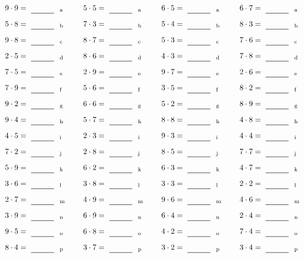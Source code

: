 \documentclass
[
  draft    = true,
  fontsize = 11pt,
  parskip  = half-
]
{scrartcl}
\begin{document}
\par\vfill\par
\begin{align*}
    \pline{9\cdot9}&=\rline{a}
  & \pline{5\cdot5}&=\rline{a}
  & \pline{6\cdot5}&=\rline{a}
  & \pline{6\cdot7}&=\rline{a} \\[1ex]
    \pline{5\cdot8}&=\rline{b}
  & \pline{7\cdot3}&=\rline{b}
  & \pline{5\cdot4}&=\rline{b}
  & \pline{8\cdot3}&=\rline{b} \\[1ex]
    \pline{9\cdot8}&=\rline{c}
  & \pline{8\cdot7}&=\rline{c}
  & \pline{5\cdot3}&=\rline{c}
  & \pline{7\cdot6}&=\rline{c} \\[1ex]
    \pline{2\cdot5}&=\rline{d}
  & \pline{8\cdot6}&=\rline{d}
  & \pline{4\cdot3}&=\rline{d}
  & \pline{7\cdot8}&=\rline{d} \\[1ex]
    \pline{7\cdot5}&=\rline{e}
  & \pline{2\cdot9}&=\rline{e}
  & \pline{9\cdot7}&=\rline{e}
  & \pline{2\cdot6}&=\rline{e} \\[1ex]
    \pline{7\cdot9}&=\rline{f}
  & \pline{5\cdot6}&=\rline{f}
  & \pline{3\cdot5}&=\rline{f}
  & \pline{8\cdot2}&=\rline{f} \\[1ex]
    \pline{9\cdot2}&=\rline{g}
  & \pline{6\cdot6}&=\rline{g}
  & \pline{5\cdot2}&=\rline{g}
  & \pline{8\cdot9}&=\rline{g} \\[1ex]
    \pline{9\cdot4}&=\rline{h}
  & \pline{5\cdot7}&=\rline{h}
  & \pline{8\cdot8}&=\rline{h}
  & \pline{4\cdot8}&=\rline{h} \\[1ex]
    \pline{4\cdot5}&=\rline{i}
  & \pline{2\cdot3}&=\rline{i}
  & \pline{9\cdot3}&=\rline{i}
  & \pline{4\cdot4}&=\rline{i} \\[1ex]
    \pline{7\cdot2}&=\rline{j}
  & \pline{2\cdot8}&=\rline{j}
  & \pline{8\cdot5}&=\rline{j}
  & \pline{7\cdot7}&=\rline{j} \\[1ex]
    \pline{5\cdot9}&=\rline{k}
  & \pline{6\cdot2}&=\rline{k}
  & \pline{6\cdot3}&=\rline{k}
  & \pline{4\cdot7}&=\rline{k} \\[1ex]
    \pline{3\cdot6}&=\rline{l}
  & \pline{3\cdot8}&=\rline{l}
  & \pline{3\cdot3}&=\rline{l}
  & \pline{2\cdot2}&=\rline{l} \\[1ex]
    \pline{2\cdot7}&=\rline{m}
  & \pline{4\cdot9}&=\rline{m}
  & \pline{9\cdot6}&=\rline{m}
  & \pline{4\cdot6}&=\rline{m} \\[1ex]
    \pline{3\cdot9}&=\rline{n}
  & \pline{6\cdot9}&=\rline{n}
  & \pline{6\cdot4}&=\rline{n}
  & \pline{2\cdot4}&=\rline{n} \\[1ex]
    \pline{9\cdot5}&=\rline{o}
  & \pline{6\cdot8}&=\rline{o}
  & \pline{4\cdot2}&=\rline{o}
  & \pline{7\cdot4}&=\rline{o} \\[1ex]
    \pline{8\cdot4}&=\rline{p}
  & \pline{3\cdot7}&=\rline{p}
  & \pline{3\cdot2}&=\rline{p}
  & \pline{3\cdot4}&=\rline{p}
\end{align*}
\end{document}

